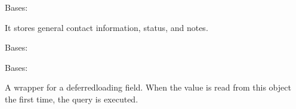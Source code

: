 \documentclass[a4paper,11pt,spanish]{sphinxmanual}
\begin{document}
\begin{fulllineitems}
\label{\detokenize{api/supplier/supplier.models:supplier.models.Supplier}}
\pysigstartsignatures
\pysiglinewithargsret
{}
{\sphinxparamcomma {}}
{}
\pysigstopsignatures
\sphinxAtStartPar
Bases: 

\sphinxAtStartPar
It stores general contact information, status, and notes.

\begin{fulllineitems}
\label{\detokenize{api/supplier/supplier.models:supplier.models.Supplier.DoesNotExist}}
\pysigstartsignatures
\pysigline
{}
\pysigstopsignatures
\sphinxAtStartPar
Bases: 

\end{fulllineitems}


\begin{fulllineitems}
\label{\detokenize{api/supplier/supplier.models:supplier.models.Supplier.MultipleObjectsReturned}}
\pysigstartsignatures
\pysigline
{}
\pysigstopsignatures
\sphinxAtStartPar
Bases: 

\end{fulllineitems}


\begin{fulllineitems}
\label{\detokenize{api/supplier/supplier.models:supplier.models.Supplier.active}}
\pysigstartsignatures
\pysigline
{}
\pysigstopsignatures
\sphinxAtStartPar
A wrapper for a deferred\sphinxhyphen{}loading field. When the value is read from this
object the first time, the query is executed.


\end{fulllineitems}
\end{fulllineitems}
\end{document}
